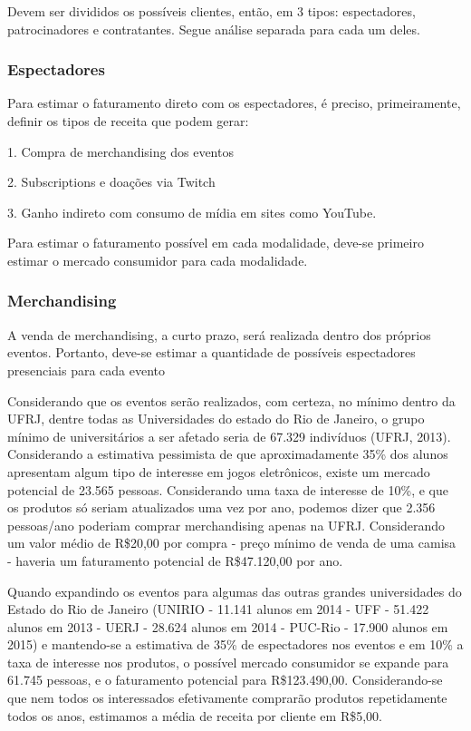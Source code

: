 \documentclass[a4paper, 12pt]{paper}
\begin{document}
Devem ser divididos os possíveis clientes, então, em 3 tipos: espectadores, patrocinadores e contratantes. Segue análise separada para cada um deles.
\subsubsection{Espectadores}

Para estimar o faturamento direto com os espectadores, é preciso, primeiramente, definir os tipos de receita que podem gerar: 

1. Compra de merchandising dos eventos 

2. Subscriptions e doações via Twitch 

3. Ganho indireto com consumo de mídia em sites como YouTube.
		
Para estimar o faturamento possível em cada modalidade, deve-se primeiro estimar o mercado consumidor para cada modalidade.

\subsubsection{Merchandising}

A venda de merchandising, a curto prazo, será realizada dentro dos próprios eventos. Portanto, deve-se estimar a quantidade de possíveis espectadores presenciais para cada evento

Considerando que os eventos serão realizados, com certeza, no mínimo dentro da UFRJ, dentre todas as Universidades do estado do Rio de Janeiro, o grupo mínimo de universitários a ser afetado seria de 67.329 indivíduos (UFRJ, 2013). Considerando a estimativa pessimista de que aproximadamente 35\% dos alunos apresentam algum tipo de interesse em jogos eletrônicos, existe um mercado potencial de 23.565 pessoas. Considerando uma taxa de interesse de 10\%, e que os produtos só seriam atualizados uma vez por ano, podemos dizer que 2.356 pessoas/ano poderiam comprar merchandising apenas na UFRJ. Considerando um valor médio de R\$20,00 por compra - preço mínimo de venda de uma camisa - haveria um faturamento potencial de R\$47.120,00 por ano.

Quando expandindo os eventos para algumas das outras grandes universidades do Estado do Rio de Janeiro (UNIRIO - 11.141 alunos em 2014 - UFF - 51.422 alunos em 2013 - UERJ - 28.624 alunos em 2014 - PUC-Rio - 17.900 alunos em 2015) e mantendo-se a estimativa de 35\% de espectadores nos eventos e em 10\% a taxa de interesse nos produtos, o possível mercado consumidor se expande para 61.745 pessoas, e o faturamento potencial para R\$123.490,00. Considerando-se que nem todos os interessados efetivamente comprarão produtos repetidamente todos os anos, estimamos a média de receita por cliente em R\$5,00.
\end{document}
